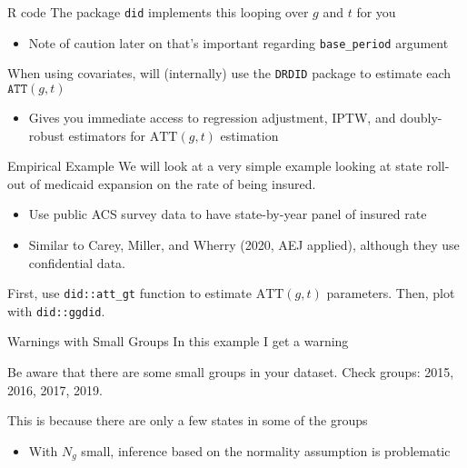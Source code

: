 \documentclass[aspectratio=169,t,11pt,table]{beamer}
\begin{document}
\begin{frame}{R code}
  The package \texttt{did} implements this looping over $g$ and $t$ for you
  \begin{itemize} 
    \item Note of caution later on that's important regarding \texttt{base\_period} argument
  \end{itemize}

  \bigskip
  When using covariates, will (internally) use the \texttt{DRDID} package to estimate each $\texttt{ATT}(g,t)$
  \begin{itemize}
    \item Gives you immediate access to regression adjustment, IPTW, and doubly-robust estimators for $\text{ATT}(g,t)$ estimation
  \end{itemize}
\end{frame}

\begin{frame}{Empirical Example}
  We will look at a very simple example looking at state roll-out of medicaid expansion on the rate of being insured. 
  \begin{itemize}
    \item Use public ACS survey data to have state-by-year panel of insured rate
    \item Similar to Carey, Miller, and Wherry (2020, AEJ applied), although they use confidential data.
  \end{itemize}

  \bigskip
  First, use \texttt{did::att\_gt} function to estimate $\text{ATT}(g,t)$ parameters. Then, plot with \texttt{did::ggdid}.
\end{frame}



\begin{frame}[fragile]{Warnings with Small Groups}
  In this example I get a warning 
  \begin{codeblock}[{}]
Be aware that there are some small groups in your dataset.
Check groups: 2015, 2016, 2017, 2019.
  \end{codeblock}

  This is because there are only a few states in some of the groups
  \begin{itemize}
    \item With $N_g$ small, inference based on the normality assumption is problematic
  \end{itemize}
\end{frame}
\end{document}
